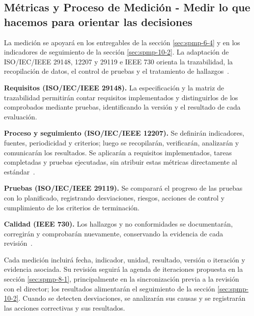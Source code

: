 
\subsection{Métricas y Proceso de Medición - Medir lo que hacemos para orientar las decisiones}\label{sec:spmp-12-4}

La medición se apoyará en los entregables de la sección \ref{sec:spmp-6-4} y en los indicadores de seguimiento de la sección \ref{sec:spmp-10-2}. La adaptación de ISO/IEC/IEEE 29148, 12207 y 29119 e IEEE 730 orienta la trazabilidad, la recopilación de datos, el control de pruebas y el tratamiento de hallazgos~\cite{std29148,std12207,std29119p2,std29119p3,ieee730,adaptacion2026}.

\textbf{Requisitos (ISO/IEC/IEEE 29148).} La especificación y la matriz de trazabilidad permitirán contar requisitos implementados y distinguirlos de los comprobados mediante pruebas, identificando la versión y el resultado de cada evaluación.

\textbf{Proceso y seguimiento (ISO/IEC/IEEE 12207).} Se definirán indicadores, fuentes, periodicidad y criterios; luego se recopilarán, verificarán, analizarán y comunicarán los resultados. Se aplicarán a requisitos implementados, tareas completadas y pruebas ejecutadas, sin atribuir estas métricas directamente al estándar~\cite{std12207,adaptacion2026}.

\textbf{Pruebas (ISO/IEC/IEEE 29119).} Se comparará el progreso de las pruebas con lo planificado, registrando desviaciones, riesgos, acciones de control y cumplimiento de los criterios de terminación.

\textbf{Calidad (IEEE 730).} Los hallazgos y no conformidades se documentarán, corregirán y comprobarán nuevamente, conservando la evidencia de cada revisión~\cite{ieee730,adaptacion2026}.

Cada medición incluirá fecha, indicador, unidad, resultado, versión o iteración y evidencia asociada. Su revisión seguirá la agenda de iteraciones propuesta en la sección \ref{sec:spmp-8-1}, principalmente en la sincronización previa a la revisión con el director; los resultados alimentarán el seguimiento de la sección \ref{sec:spmp-10-2}. Cuando se detecten desviaciones, se analizarán sus causas y se registrarán las acciones correctivas y sus resultados.
